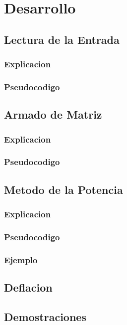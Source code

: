 \section{Desarrollo}
\subsection{Lectura de la Entrada}
\subsubsection{Explicacion}
\subsubsection{Pseudocodigo}
\subsection{Armado de Matriz}
\subsubsection{Explicacion}
\subsubsection{Pseudocodigo}
\subsection{Metodo de la Potencia}
\subsubsection{Explicacion}
\subsubsection{Pseudocodigo}
\subsubsection{Ejemplo}
\subsection{Deflacion}
\subsection{Demostraciones}


